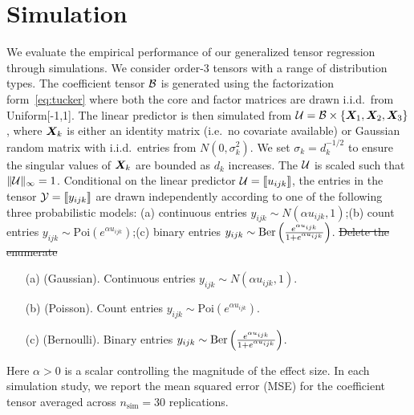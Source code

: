\documentclass{article}
\theoremstyle{plain}
\theoremstyle{definition}
\providecommand{\DIFdeltex}[1]{{\protect\color{red}\sout{#1}}}                      %
\providecommand{\DIFdel}[1]{{\DIFdeltex{#1}}} %
\begin{document}
\section{Simulation}\label{sec:simulation}
We evaluate the empirical performance of our generalized tensor regression through simulations. We consider order-3 tensors with a range of distribution types. The coefficient tensor $\mathcal{B}$ is generated using the factorization form~\eqref{eq:tucker} where both the core and factor matrices are drawn i.i.d.\ from Uniform[-1,1]. The linear predictor is then simulated from $\mathcal{U}=\mathcal{B}\times\{\bm X_1,\bm X_2,\bm X_3\}$, where $\bm X_k$ is either an identity matrix (i.e.\ no covariate available) or Gaussian random matrix with i.i.d.\ entries from $N(0,\sigma_k^2)$. We set $\sigma_k=d_k^{-1/2}$ to ensure the singular values of $\bm X_k$ are bounded as $d_k$ increases. The $\mathcal{U}$ is scaled such that $\lVert\mathcal{U}\rVert_\infty=1$. Conditional on the linear predictor $\mathcal{U}=\llbracket u_{ijk} \rrbracket$, the entries in the tensor $\mathcal{Y}=\llbracket y_{ijk} \rrbracket$ are drawn independently according to one of the following three probabilistic models: (a) continuous entries $y_{ijk}\sim N\left(\alpha u_{ijk}, 1\right)$;(b) count entries $y_{ijk}\sim\text{Poi}\left( e^{\alpha u_{ijk}}\right)$;(c) binary entries $y_{ijk}\sim \text{Ber}\left( {e^{\alpha u_{ijk}} \over 1+e^{\alpha u_{ijk}}}\right)$.
\DIFdel{Delete the enumerate}
\begin{enumerate}[itemsep=-.5pt,topsep=-.5pt,leftmargin=*,partopsep=-.5pt]
\item[(a)] (Gaussian). Continuous entries $y_{ijk}\sim N\left(\alpha u_{ijk}, 1\right)$.
\item[(b)] (Poisson). Count entries $y_{ijk}\sim\text{Poi}\left( e^{\alpha u_{ijk}}\right)$.
\item[(c)] (Bernoulli). Binary entries $y_{ijk}\sim \text{Ber}\left( {e^{\alpha u_{ijk}} \over 1+e^{\alpha u_{ijk}}}\right)$.
\end{enumerate}
Here $\alpha>0$ is a scalar controlling the magnitude of the effect size. In each simulation study, we report the mean squared error (MSE) for the coefficient tensor averaged across $n_{\text{sim}}=30$ replications. 
\end{document}
